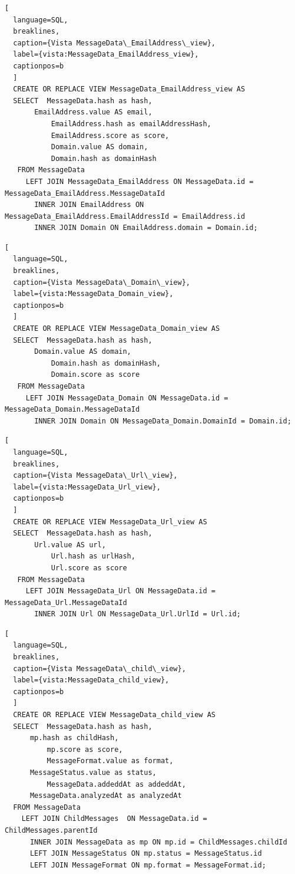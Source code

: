 \begin{lstlisting}[
  language=SQL,
  breaklines, 
  caption={Vista MessageData\_EmailAddress\_view}, 
  label={vista:MessageData_EmailAddress_view}, 
  captionpos=b
  ]
  CREATE OR REPLACE VIEW MessageData_EmailAddress_view AS 
  SELECT  MessageData.hash as hash,
       EmailAddress.value AS email, 
           EmailAddress.hash as emailAddressHash, 
           EmailAddress.score as score,
           Domain.value AS domain,
           Domain.hash as domainHash
   FROM MessageData 
     LEFT JOIN MessageData_EmailAddress ON MessageData.id = MessageData_EmailAddress.MessageDataId
       INNER JOIN EmailAddress ON MessageData_EmailAddress.EmailAddressId = EmailAddress.id
       INNER JOIN Domain ON EmailAddress.domain = Domain.id;
\end{lstlisting}

\begin{lstlisting}[
  language=SQL,
  breaklines, 
  caption={Vista MessageData\_Domain\_view}, 
  label={vista:MessageData_Domain_view}, 
  captionpos=b
  ]
  CREATE OR REPLACE VIEW MessageData_Domain_view AS 
  SELECT  MessageData.hash as hash,
       Domain.value AS domain, 
           Domain.hash as domainHash, 
           Domain.score as score
   FROM MessageData 
     LEFT JOIN MessageData_Domain ON MessageData.id = MessageData_Domain.MessageDataId
       INNER JOIN Domain ON MessageData_Domain.DomainId = Domain.id;
\end{lstlisting}

\begin{lstlisting}[
  language=SQL,
  breaklines, 
  caption={Vista MessageData\_Url\_view}, 
  label={vista:MessageData_Url_view}, 
  captionpos=b
  ]
  CREATE OR REPLACE VIEW MessageData_Url_view AS 
  SELECT  MessageData.hash as hash,
       Url.value AS url, 
           Url.hash as urlHash, 
           Url.score as score
   FROM MessageData 
     LEFT JOIN MessageData_Url ON MessageData.id = MessageData_Url.MessageDataId
       INNER JOIN Url ON MessageData_Url.UrlId = Url.id;

\end{lstlisting}

\begin{lstlisting}[
  language=SQL,
  breaklines, 
  caption={Vista MessageData\_child\_view}, 
  label={vista:MessageData_child_view}, 
  captionpos=b
  ]
  CREATE OR REPLACE VIEW MessageData_child_view AS 
  SELECT  MessageData.hash as hash,
      mp.hash as childHash, 
          mp.score as score,
          MessageFormat.value as format,
      MessageStatus.value as status,
          MessageData.addeddAt as addeddAt,
      MessageData.analyzedAt as analyzedAt
  FROM MessageData 
    LEFT JOIN ChildMessages  ON MessageData.id = ChildMessages.parentId
      INNER JOIN MessageData as mp ON mp.id = ChildMessages.childId
      LEFT JOIN MessageStatus ON mp.status = MessageStatus.id
      LEFT JOIN MessageFormat ON mp.format = MessageFormat.id;
\end{lstlisting}

